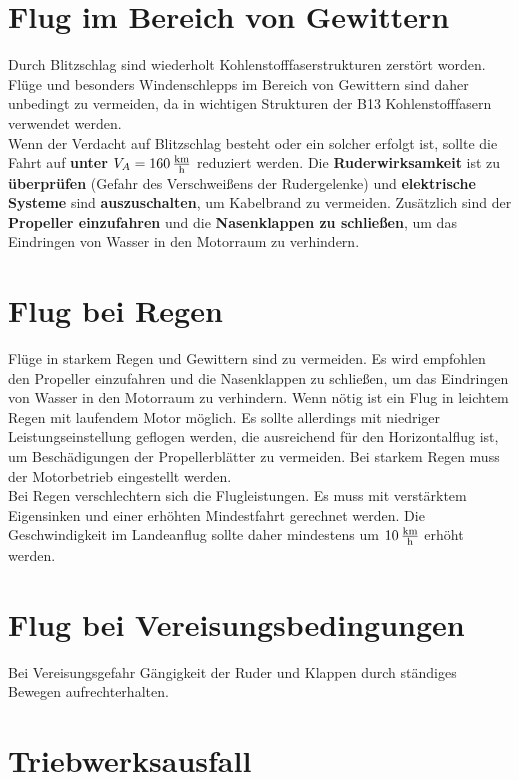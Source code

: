 \section{Flug im Bereich von Gewittern}
Durch Blitzschlag sind wiederholt Kohlenstofffaserstrukturen zerstört worden. Flüge und besonders Windenschlepps im Bereich von Gewittern sind daher unbedingt zu vermeiden, da in wichtigen Strukturen der B13 Kohlenstofffasern verwendet werden.\\
Wenn der Verdacht auf Blitzschlag besteht oder ein solcher erfolgt ist, sollte die Fahrt auf \textbf{unter $V_A=\unit[160]{\frac{km}{h}}$} reduziert werden. Die \textbf{Ruderwirksamkeit} ist zu \textbf{überprüfen} (Gefahr des Verschweißens der Rudergelenke) und \textbf{elektrische Systeme} sind \textbf{auszuschalten}, um Kabelbrand zu vermeiden.
Zusätzlich sind der \textbf{Propeller einzufahren} und die \textbf{Nasenklappen zu schließen}, um das Eindringen von Wasser in den Motorraum zu verhindern.



\section{Flug bei Regen}
Flüge in starkem Regen und Gewittern sind zu vermeiden. Es wird empfohlen den Propeller einzufahren und die Nasenklappen zu schließen, um das Eindringen von Wasser in den Motorraum zu verhindern.
Wenn nötig ist ein Flug in leichtem Regen mit laufendem Motor möglich. Es sollte allerdings mit niedriger Leistungseinstellung geflogen werden, die ausreichend für den Horizontalflug ist, um Beschädigungen der Propellerblätter zu vermeiden. Bei starkem Regen muss der Motorbetrieb eingestellt werden. \\

Bei Regen verschlechtern sich die Flugleistungen. Es muss mit verstärktem Eigensinken und einer erhöhten Mindestfahrt gerechnet werden. Die Geschwindigkeit im Landeanflug sollte daher mindestens um $\unit[10]{\frac{km}{h}}$ erhöht werden. 

\section{Flug bei Vereisungsbedingungen}
Bei Vereisungsgefahr Gängigkeit der Ruder und Klappen durch ständiges Bewegen aufrechterhalten.
\newpage
\section{Triebwerksausfall}
